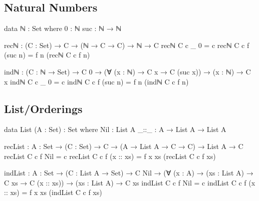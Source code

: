 \documentclass[12pt]{article}
\begin{document}
\subsection*{Natural Numbers}
\begin{center}
\begin{minipage}{0.9\textwidth}
\begin{code}
data ℕ : Set where
  0 : ℕ
  suc : ℕ → ℕ

recℕ : (C : Set) → C → (ℕ → C → C) → ℕ → C
recℕ C c _ 0 = c
recℕ C c f (suc n) = f n (recℕ C c f n) 

indℕ : (C : ℕ → Set) → C 0 →
       (∀ (x : ℕ) → C x → C (suc x)) →
       (x : ℕ) → C x
indℕ C c _ 0 = c
indℕ C c f (suc n) = f n (indℕ C c f n)
\end{code}
\end{minipage}
\end{center}

\subsection*{List/Orderings}
\begin{center}
\begin{minipage}{0.9\textwidth}
\begin{code}
data List (A : Set) : Set where
  Nil  : List A
  _::_ : A → List A → List A

recList : {A : Set} → (C : Set) → C →
          (A → List A → C → C) → List A → C
recList C c f Nil = c
recList C c f (x :: xs) = f x xs (recList C c f xs)

indList : {A : Set} → (C : List A → Set) → C Nil →
          (∀ (x : A) → (xs : List A) → C xs → C (x :: xs)) →
          (xs : List A) → C xs
indList C c f Nil = c
indList C c f (x :: xs) = f x xs (indList C c f xs)
\end{code}
\end{minipage}
\end{center}
\end{document}
